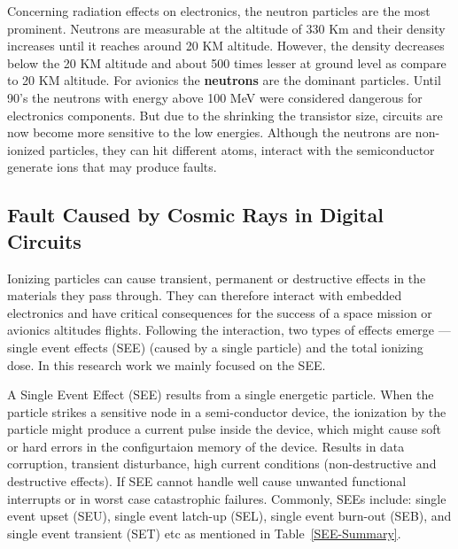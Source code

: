 Concerning radiation effects on electronics, the neutron particles are the most prominent. Neutrons are measurable at the altitude of 330 Km and their density increases until it reaches around 20 KM altitude. However, the density decreases below the 20 KM altitude and about 500 times lesser at ground level as compare to 20 KM altitude. For avionics the \textbf{neutrons} are the dominant particles.  Until 90's the neutrons with energy above 100 MeV were considered dangerous for electronics components. But due to the shrinking the transistor size, circuits are now become more sensitive to the low energies. Although the neutrons are non-ionized particles, they can hit different atoms, interact with the semiconductor generate ions that may produce faults.   

\subsection{Fault Caused by Cosmic Rays in Digital Circuits}


Ionizing particles can cause transient, permanent or destructive effects in the materials they pass through. They can therefore interact with embedded electronics and have critical consequences for the success of a space mission or avionics altitudes flights. Following the interaction, two types of effects emerge ---
single event effects (SEE) (caused by a single particle) and the total ionizing dose. In this research work we mainly focused on the SEE.


A Single Event Effect (SEE) results from a single energetic particle. When the particle strikes a sensitive node in a semi-conductor device, the ionization by the particle might produce a current pulse inside the device, which might cause soft or hard errors in the configurtaion memory of the device. Results in data corruption, transient disturbance, high current conditions (non-destructive and destructive
effects). If SEE cannot handle well cause unwanted functional interrupts or in worst case catastrophic failures. Commonly, SEEs include: single event upset (SEU), single event latch-up (SEL), single event burn-out (SEB), and single event transient (SET) etc as mentioned in Table~\ref{SEE-Summary}. 



